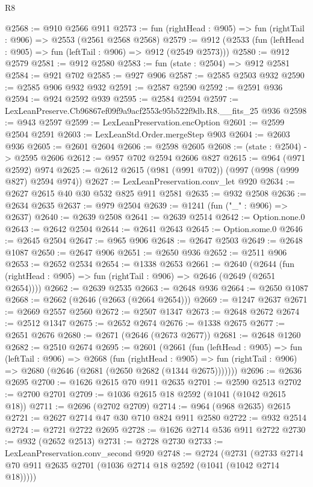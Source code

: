 \begin{lexlean}{R8}
\begin{coremodule}
@2568 := @910 @2566 @911
@2573 := fun (rightHead : @905) => fun (rightTail : @906) => @2553 (@2561 @2568 @2568)
@2579 := @912 (@2533 (fun (leftHead : @905) => fun (leftTail : @906) => @912 (@2549 @2573)))
@2580 := @912 @2579
@2581 := @912 @2580
@2583 := fun (state : @2504) => @912 @2581
@2584 := @921 @702
@2585 := @927 @906
@2587 := @2585 @2503 @932
@2590 := @2585 @906 @932 @932
@2591 := @2587 @2590
@2592 := @2591 @936
@2594 := @924 @2592 @939
@2595 := @2584 @2594
@2597 := LexLeanPreserve.Cb96867ef09f9a9acf2553c95b522f9db.R8.__fits_25 @936
@2598 := @943 @2597
@2599 := LexLeanPreservation.encOption
@2601 := @2599 @2504 @2591
@2603 := LexLeanStd.Order.mergeStep @903
@2604 := @2603 @936
@2605 := @2601 @2604
@2606 := @2598 @2605
@2608 := (state : @2504) -> @2595 @2606
@2612 := @957 @702 @2594 @2606 @827
@2615 := @964 (@971 @2592) @974
@2625 := @2612 @2615 (@981 (@991 @702)) (@997 (@998 (@999 @827) @2594 @974))
@2627 := LexLeanPreservation.conv_let @920
@2634 := @2627 @2615 @40 @30 @532 @825 @911 @2581
@2635 := @932 @2508
@2636 := @2634 @2635
@2637 := @979 @2504
@2639 := @1241 (fun ("_" : @906) => @2637)
@2640 := @2639 @2508
@2641 := @2639 @2514
@2642 := Option.none.{0}
@2643 := @2642 @2504
@2644 := @2641 @2643
@2645 := Option.some.{0}
@2646 := @2645 @2504
@2647 := @965 @906
@2648 := @2647 @2503
@2649 := @2648 @1087
@2650 := @2647 @906
@2651 := @2650 @936
@2652 := @2511 @906
@2653 := @2652 @2534
@2654 := @1338 @2653
@2661 := @2640
    (@2644 (fun (rightHead : @905) => fun (rightTail : @906) => @2646 (@2649 (@2651 @2654))))
@2662 := @2639 @2535
@2663 := @2648 @936
@2664 := @2650 @1087
@2668 := @2662 (@2646 (@2663 (@2664 @2654)))
@2669 := @1247 @2637
@2671 := @2669 @2557 @2560
@2672 := @2507 @1347
@2673 := @2648 @2672
@2674 := @2512 @1347
@2675 := @2652 @2674
@2676 := @1338 @2675
@2677 := @2651 @2676
@2680 := @2671 (@2646 (@2673 @2677))
@2681 := @2648 @1260
@2682 := @2510 @2674
@2695 := @2601
    (@2661
      (fun (leftHead : @905) =>
      fun (leftTail : @906) =>
      @2668
        (fun (rightHead : @905) =>
        fun (rightTail : @906) => @2680 (@2646 (@2681 (@2650 @2682 (@1344 @2675)))))))
@2696 := @2636 @2695
@2700 := @1626 @2615 @70 @911 @2635
@2701 := @2590 @2513
@2702 := @2700 @2701
@2709 := @1036 @2615 @18 @2592 (@1041 (@1042 @2615 @18))
@2711 := @2696 (@2702 @2709)
@2714 := @964 (@968 @2635) @2615
@2721 := @2627 @2714 @47 @30 @710 @824 @911 @2580
@2722 := @932 @2514
@2724 := @2721 @2722 @2695
@2728 := @1626 @2714 @536 @911 @2722
@2730 := @932 (@2652 @2513)
@2731 := @2728 @2730
@2733 := LexLeanPreservation.conv_second @920
@2748 := @2724
    (@2731 (@2733 @2714 @70 @911 @2635 @2701 (@1036 @2714 @18 @2592 (@1041 (@1042 @2714 @18)))))

\end{coremodule}
\end{lexlean}
